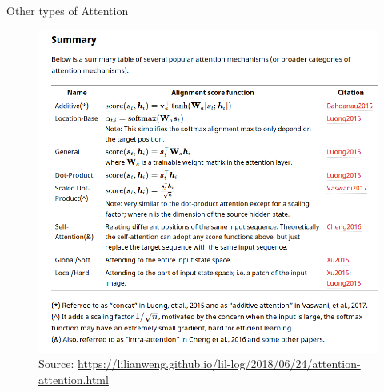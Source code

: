 \begin{frame}{Other types of Attention}
\begin{scriptsize}

       \begin{figure}[h]
        	\includegraphics[scale = 0.32]{pics/types_of_attention.png}
        	\caption{Source: \url{https://lilianweng.github.io/lil-log/2018/06/24/attention-attention.html}}
        \end{figure}  


\end{scriptsize}
\end{frame}

